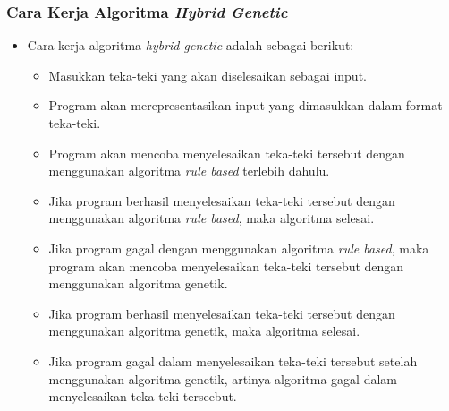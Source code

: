 \documentclass{beamer}
\begin{document}
\begin{frame}
\frametitle{Cara Kerja Algoritma \textit{Hybrid Genetic}}
\begin{itemize}
\item Cara kerja algoritma \textit{hybrid genetic} adalah sebagai berikut:
	\begin{itemize}
	\item Masukkan teka-teki yang akan diselesaikan sebagai input.
	\item Program akan merepresentasikan input yang dimasukkan dalam format teka-teki.
	\item Program akan mencoba menyelesaikan teka-teki tersebut dengan menggunakan algoritma \textit{rule based} terlebih dahulu.
	\item Jika program berhasil menyelesaikan teka-teki tersebut dengan menggunakan algoritma \textit{rule based}, maka algoritma selesai.
	\item Jika program gagal dengan menggunakan algoritma \textit{rule based}, maka program akan mencoba menyelesaikan teka-teki tersebut dengan menggunakan algoritma genetik.
	\item Jika program berhasil menyelesaikan teka-teki tersebut dengan menggunakan algoritma genetik, maka algoritma selesai.
	\item Jika program gagal dalam menyelesaikan teka-teki tersebut setelah menggunakan algoritma genetik, artinya algoritma gagal dalam menyelesaikan teka-teki terseebut.
	\end{itemize}
\end{itemize}
\end{frame}

\end{document}
